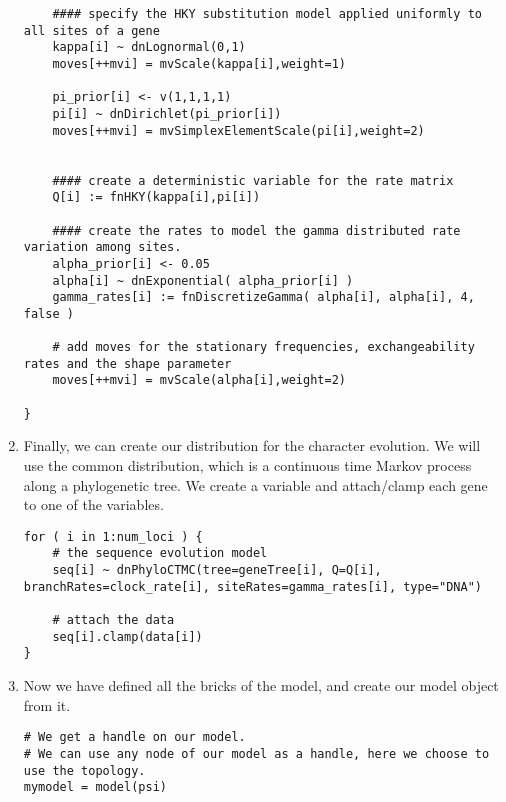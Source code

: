 \begin{enumerate}
{\begin{snugshade*}
\begin{lstlisting}
    #### specify the HKY substitution model applied uniformly to all sites of a gene
    kappa[i] ~ dnLognormal(0,1)
    moves[++mvi] = mvScale(kappa[i],weight=1)

    pi_prior[i] <- v(1,1,1,1) 
    pi[i] ~ dnDirichlet(pi_prior[i])
    moves[++mvi] = mvSimplexElementScale(pi[i],weight=2)


    #### create a deterministic variable for the rate matrix
    Q[i] := fnHKY(kappa[i],pi[i]) 

    #### create the rates to model the gamma distributed rate variation among sites.
    alpha_prior[i] <- 0.05
    alpha[i] ~ dnExponential( alpha_prior[i] )
    gamma_rates[i] := fnDiscretizeGamma( alpha[i], alpha[i], 4, false )

    # add moves for the stationary frequencies, exchangeability rates and the shape parameter
    moves[++mvi] = mvScale(alpha[i],weight=2)

}

\end{lstlisting}
\end{snugshade*}}


\item Finally, we can create our distribution for the character evolution.
We will use the common  distribution, which is a continuous time Markov process along a phylogenetic tree.
We create a  variable and attach/clamp each gene to one of the  variables.
{\tt \begin{snugshade*}
\begin{lstlisting}
for ( i in 1:num_loci ) { 
    # the sequence evolution model
    seq[i] ~ dnPhyloCTMC(tree=geneTree[i], Q=Q[i], branchRates=clock_rate[i], siteRates=gamma_rates[i], type="DNA")

    # attach the data
    seq[i].clamp(data[i])
}
\end{lstlisting}
\end{snugshade*}}


\item Now we have defined all the bricks of the model, and create our model object from it.
{\tt \begin{snugshade*}
\begin{lstlisting}
# We get a handle on our model.
# We can use any node of our model as a handle, here we choose to use the topology.
mymodel = model(psi)
\end{lstlisting}
\end{snugshade*}}



\end{enumerate}
